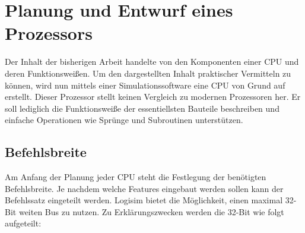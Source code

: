 \documentclass[12pt]{article}
\begin{document}
\section{Planung und Entwurf eines Prozessors}
Der Inhalt der bisherigen Arbeit handelte von den Komponenten einer CPU und deren Funktionsweißen. Um den dargestellten Inhalt praktischer Vermitteln zu können, wird nun mittels einer Simulationssoftware eine CPU von Grund auf erstellt. Dieser Prozessor stellt keinen Vergleich zu modernen Prozessoren her. Er soll lediglich die Funktionsweiße der essentiellsten Bauteile beschreiben und einfache Operationen wie Sprünge und Subroutinen unterstützen.
\subsection{Befehlsbreite}
Am Anfang der Planung jeder CPU steht die Festlegung der benötigten Befehlsbreite. Je nachdem welche Features eingebaut werden sollen kann der Befehlssatz eingeteilt werden. Logisim bietet die Möglichkeit, einen maximal 32-Bit weiten Bus zu nutzen. Zu Erklärungszwecken werden die 32-Bit wie folgt aufgeteilt:
\end{document}
